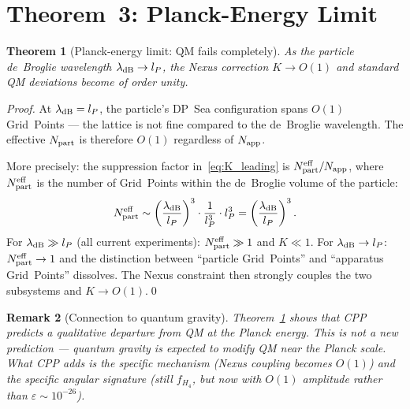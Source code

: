 \documentclass[11pt,a4paper]{article}
\newtheorem{theorem}{Theorem}[section]
\newtheorem{remark}[theorem]{Remark}
\newcommand{\lP}{l_P}
\newcommand{\eps}{\varepsilon}
\newcommand{\Napp}{N_{\rm app}}
\newcommand{\Npart}{N_{\rm part}}
\begin{document}
\section{Theorem~3: Planck-Energy Limit}
\label{sec:planck}

\begin{theorem}[Planck-energy limit: QM fails completely]
\label{thm:planck}
As the particle de~Broglie wavelength $\lambda_{\rm dB} \to \lP$,
the Nexus correction $K \to O(1)$ and standard QM deviations
become of order unity.
\end{theorem}

\begin{proof}
At $\lambda_{\rm dB} = \lP$, the particle's DP~Sea configuration
spans $O(1)$ Grid~Points --- the lattice is not fine compared to the
de~Broglie wavelength.  The effective $\Npart$ is therefore $O(1)$
regardless of $\Napp$.

More precisely: the suppression factor in~\eqref{eq:K_leading} is
$\Npart^{\rm eff}/\Napp$, where $\Npart^{\rm eff}$ is the number of
Grid~Points within the de~Broglie volume of the particle:
\begin{equation}
\Npart^{\rm eff}
\sim \left(\frac{\lambda_{\rm dB}}{\lP}\right)^3 \cdot
     \frac{1}{\lP^3} \cdot \lP^3
= \left(\frac{\lambda_{\rm dB}}{\lP}\right)^3.
\label{eq:Npart_eff}
\end{equation}
For $\lambda_{\rm dB} \gg \lP$ (all current experiments):
$\Npart^{\rm eff} \gg 1$ and $K \ll 1$.
For $\lambda_{\rm dB} \to \lP$: $\Npart^{\rm eff} \to 1$ and
the distinction between ``particle Grid~Points'' and ``apparatus
Grid~Points'' dissolves.  The Nexus constraint then strongly
couples the two subsystems and $K \to O(1)$.\qed
\end{proof}

\begin{remark}[Connection to quantum gravity]
Theorem~\ref{thm:planck} shows that CPP predicts a qualitative
departure from QM at the Planck energy.  This is not a new
prediction --- quantum gravity is expected to modify QM near the
Planck scale.  What CPP adds is the \emph{specific mechanism}
(Nexus coupling becomes $O(1)$) and the \emph{specific angular
signature} (still $f_{H_4}$, but now with $O(1)$ amplitude rather
than $\eps \sim 10^{-26}$).
\end{remark}

\end{document}
